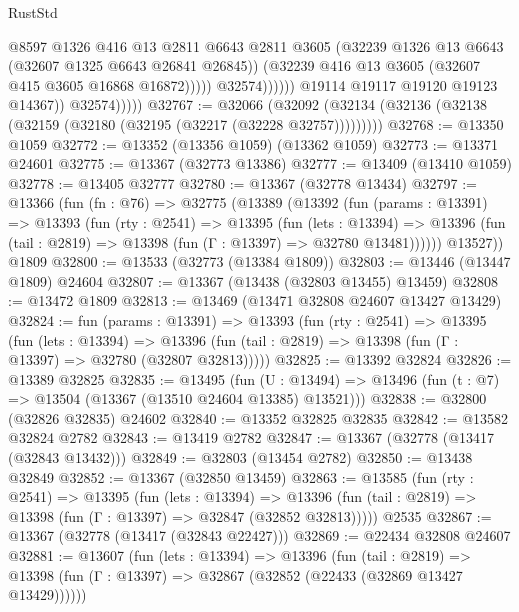 \begin{lexlean}{RustStd}
\begin{coremodule}
                                    @8597
                                    @1326
                                    @416
                                    @13
                                    @2811
                                    @6643
                                    @2811
                                    @3605
                                    (@32239 @1326 @13 @6643 (@32607 @1325 @6643 @26841 @26845))
                                    (@32239 @416 @13 @3605 (@32607 @415 @3605 @16868 @16872)))))
                              @32574))))))
                  @19114
                  @19117
                  @19120
                  @19123
                  @14367))
              @32574)))))
@32767 := @32066
    (@32092 (@32134 (@32136 (@32138 (@32159 (@32180 (@32195 (@32217 (@32228 @32757)))))))))
@32768 := @13350 @1059
@32772 := @13352 (@13356 @1059) (@13362 @1059)
@32773 := @13371 @24601
@32775 := @13367 (@32773 @13386)
@32777 := @13409 (@13410 @1059)
@32778 := @13405 @32777
@32780 := @13367 (@32778 @13434)
@32797 := @13366
    (fun (fn : @76) =>
    @32775
      (@13389
        (@13392
          (fun (params : @13391) =>
          @13393
            (fun (rty : @2541) =>
            @13395
              (fun (lets : @13394) =>
              @13396 (fun (tail : @2819) => @13398 (fun (Γ : @13397) => @32780 @13481))))))
        @13527))
    @1809
@32800 := @13533 (@32773 (@13384 @1809))
@32803 := @13446 (@13447 @1809) @24604
@32807 := @13367 (@13438 (@32803 @13455) @13459)
@32808 := @13472 @1809
@32813 := @13469 (@13471 @32808 @24607 @13427 @13429)
@32824 := fun (params : @13391) =>
  @13393
    (fun (rty : @2541) =>
    @13395
      (fun (lets : @13394) =>
      @13396 (fun (tail : @2819) => @13398 (fun (Γ : @13397) => @32780 (@32807 @32813)))))
@32825 := @13392 @32824
@32826 := @13389 @32825
@32835 := @13495
    (fun (U : @13494) => @13496 (fun (t : @7) => @13504 (@13367 (@13510 @24604 @13385) @13521)))
@32838 := @32800 (@32826 @32835) @24602
@32840 := @13352 @32825 @32835
@32842 := @13582 @32824 @2782
@32843 := @13419 @2782
@32847 := @13367 (@32778 (@13417 (@32843 @13432)))
@32849 := @32803 (@13454 @2782)
@32850 := @13438 @32849
@32852 := @13367 (@32850 @13459)
@32863 := @13585
    (fun (rty : @2541) =>
    @13395
      (fun (lets : @13394) =>
      @13396 (fun (tail : @2819) => @13398 (fun (Γ : @13397) => @32847 (@32852 @32813)))))
    @2535
@32867 := @13367 (@32778 (@13417 (@32843 @22427)))
@32869 := @22434 @32808 @24607
@32881 := @13607
    (fun (lets : @13394) =>
    @13396
      (fun (tail : @2819) =>
      @13398 (fun (Γ : @13397) => @32867 (@32852 (@22433 (@32869 @13427 @13429))))))

\end{coremodule}
\end{lexlean}
